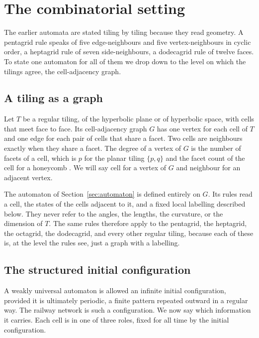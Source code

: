 \section{The combinatorial setting}
\label{sec:setting}

The earlier automata are stated tiling by tiling because they read geometry. A pentagrid rule speaks of five
edge-neighbours and five vertex-neighbours in cyclic order, a heptagrid rule of seven side-neighbours, a
dodecagrid rule of twelve faces. To state one automaton for all of them we drop down to the level on which the
tilings agree, the cell-adjacency graph.

\subsection{A tiling as a graph}

Let $T$ be a regular tiling, of the hyperbolic plane or of hyperbolic space, with cells that meet face to
face. Its cell-adjacency graph $G$ has one vertex for each cell of $T$ and one edge for each pair of cells that
share a facet. Two cells are neighbours exactly when they share a facet. The degree of a vertex of $G$ is the
number of facets of a cell, which is $p$ for the planar tiling $\{p,q\}$ and the facet count of the cell for a
honeycomb \cite{coxeter1973}. We will say cell for a vertex of $G$ and neighbour for an adjacent vertex.

The automaton of Section~\ref{sec:automaton} is defined entirely on $G$. Its rules read a cell, the states of
the cells adjacent to it, and a fixed local labelling described below. They never refer to the angles, the
lengths, the curvature, or the dimension of $T$. The same rules therefore apply to the pentagrid, the
heptagrid, the octagrid, the dodecagrid, and every other regular tiling, because each of these is, at the
level the rules see, just a graph with a labelling.

\subsection{The structured initial configuration}

A weakly universal automaton is allowed an infinite initial configuration, provided it is ultimately periodic,
a finite pattern repeated outward in a regular way. The railway network is such a configuration. We now say
which information it carries. Each cell is in one of three roles, fixed for all time by the initial
configuration.

